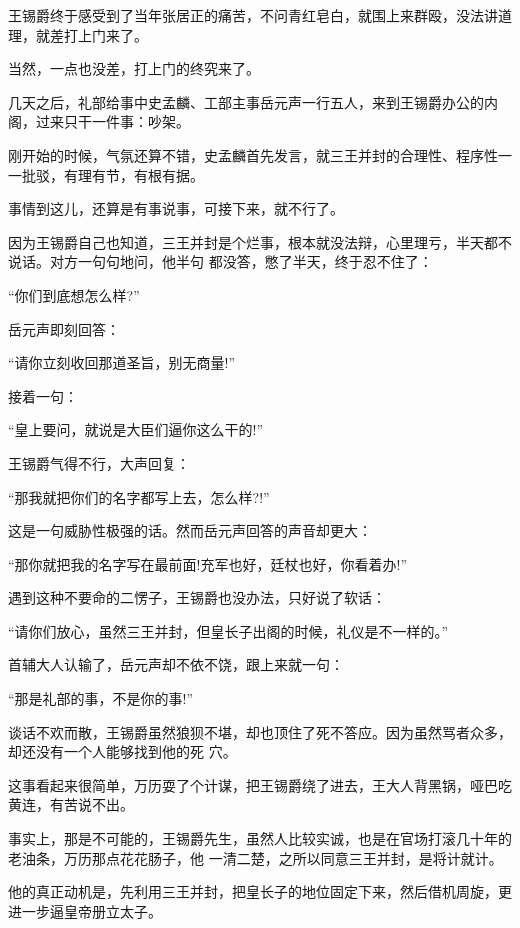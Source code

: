 \documentclass[11pt,a4paper,onecolumn]{article}
\begin{document}
王锡爵终于感受到了当年张居正的痛苦，不问青红皂白，就围上来群殴，没法讲道理，就差打上门来了。

当然，一点也没差，打上门的终究来了。

几天之后，礼部给事中史孟麟、工部主事岳元声一行五人，来到王锡爵办公的内阁，过来只干一件事：吵架。

刚开始的时候，气氛还算不错，史孟麟首先发言，就三王并封的合理性、程序性一一批驳，有理有节，有根有据。

事情到这儿，还算是有事说事，可接下来，就不行了。

因为王锡爵自己也知道，三王并封是个烂事，根本就没法辩，心里理亏，半天都不说话。对方一句句地问，他半句
都没答，憋了半天，终于忍不住了：

``你们到底想怎么样?''

岳元声即刻回答：

``请你立刻收回那道圣旨，别无商量!''

接着一句：

``皇上要问，就说是大臣们逼你这么干的!''

王锡爵气得不行，大声回复：

``那我就把你们的名字都写上去，怎么样?!''

这是一句威胁性极强的话。然而岳元声回答的声音却更大：

``那你就把我的名字写在最前面!充军也好，廷杖也好，你看着办!''

遇到这种不要命的二愣子，王锡爵也没办法，只好说了软话：

``请你们放心，虽然三王并封，但皇长子出阁的时候，礼仪是不一样的。''

首辅大人认输了，岳元声却不依不饶，跟上来就一句：

``那是礼部的事，不是你的事!''

谈话不欢而散，王锡爵虽然狼狈不堪，却也顶住了死不答应。因为虽然骂者众多，却还没有一个人能够找到他的死
穴。

这事看起来很简单，万历耍了个计谋，把王锡爵绕了进去，王大人背黑锅，哑巴吃黄连，有苦说不出。

事实上，那是不可能的，王锡爵先生，虽然人比较实诚，也是在官场打滚几十年的老油条，万历那点花花肠子，他
一清二楚，之所以同意三王并封，是将计就计。

他的真正动机是，先利用三王并封，把皇长子的地位固定下来，然后借机周旋，更进一步逼皇帝册立太子。

\section[\thesection]{}
\end{document}
